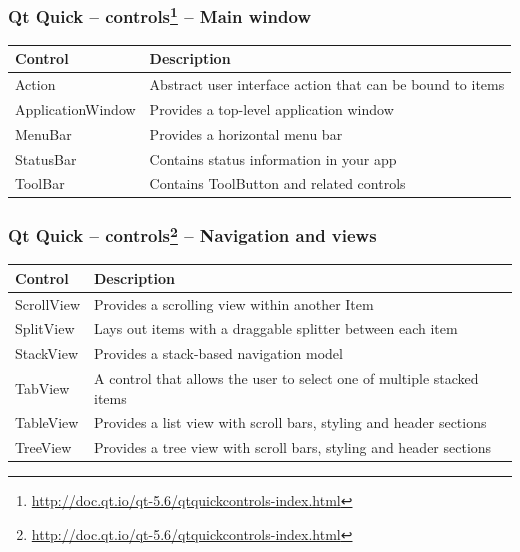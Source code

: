 \begin{frame}
  \frametitle{Qt Quick -- controls\footnote
    {\url{http://doc.qt.io/qt-5.6/qtquickcontrols-index.html}} -- Main window}
  \begin{tabular}{|p{}|p{}|}
        \hline
        \textbf{Control} & \textbf{Description} \\
        \hline
        Action & Abstract user interface action that can be bound to items \\
        \hline
        ApplicationWindow & Provides a top-level application window \\
        \hline
        MenuBar & Provides a horizontal menu bar \\
        \hline
        StatusBar & Contains status information in your app \\
        \hline
        ToolBar & Contains ToolButton and related controls \\
        \hline
  \end{tabular}
\end{frame}

\begin{frame}
  \frametitle{Qt Quick -- controls\footnote
    {\url{http://doc.qt.io/qt-5.6/qtquickcontrols-index.html}} -- Navigation and views}
  \begin{tabular}{|p{}|p{}|}
        \hline
        \textbf{Control} & \textbf{Description} \\
        \hline
        ScrollView & Provides a scrolling view within another Item \\
        \hline
        SplitView & Lays out items with a draggable splitter between each item \\
        \hline
        StackView & Provides a stack-based navigation model \\
        \hline
        TabView & A control that allows the user to select one of multiple stacked items \\
        \hline
        TableView & Provides a list view with scroll bars, styling and header sections \\
        \hline
        TreeView & Provides a tree view with scroll bars, styling and header sections \\
        \hline
  \end{tabular}
\end{frame}

